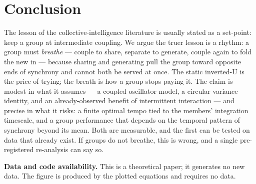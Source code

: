 \documentclass[11pt]{article}
\begin{document}
\section{Conclusion}

The lesson of the collective-intelligence literature is usually stated as a set-point: keep a group at intermediate coupling. We argue the truer lesson is a rhythm: a group must \emph{breathe} --- couple to share, separate to generate, couple again to fold the new in --- because sharing and generating pull the group toward opposite ends of synchrony and cannot both be served at once. The static inverted-U is the price of trying; the breath is how a group stops paying it. The claim is modest in what it assumes --- a coupled-oscillator model, a circular-variance identity, and an already-observed benefit of intermittent interaction --- and precise in what it risks: a finite optimal tempo tied to the members' integration timescale, and a group performance that depends on the temporal pattern of synchrony beyond its mean. Both are measurable, and the first can be tested on data that already exist. If groups do not breathe, this is wrong, and a single pre-registered re-analysis can say so.

\bigskip

\noindent\textbf{Data and code availability.} This is a theoretical paper; it generates no new data. The figure is produced by the plotted equations and requires no data.

\bigskip


\end{document}
